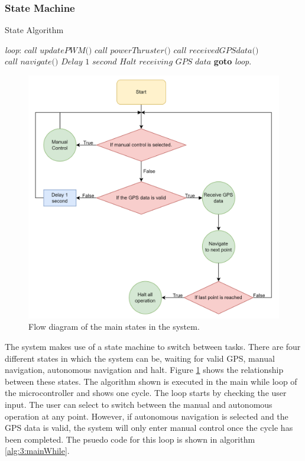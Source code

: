 		\subsubsection{State Machine}
		\begin{algorithm}[!hb]
			\caption{State Algorithm}
			\label{alg:3:mainWhile}
			\begin{algorithmic}[1]
				\BState \emph{loop}:
				\State $\textit{call updatePWM()}$
				\State $\textit{call powerThruster()}$
				\Else 
				\State $\textit{call receivedGPSdata()}$
				\State $\textit{call navigate()}$
				\Else
				\State $\textit{Delay 1 second}$
				\EndIf
				\State $\textit{Halt receiving GPS data}$
				\EndIf
				\EndIf
				\State \textbf{goto} \emph{loop}.
			\end{algorithmic}
		\end{algorithm}
	\begin{figure}[!ht]
		\begin{center}
			\includegraphics[width = 0.66\linewidth]{figures/statemachine.png}
			\caption{Flow diagram of the main states in the system.}
			\label{fig:3:stateMachine}
		\end{center}
	\end{figure}
		The system makes use of a state machine to switch between tasks. There are four different states in which the system can be, waiting for valid GPS, manual navigation, autonomous navigation and halt. Figure \ref{fig:3:stateMachine} shows the relationship between these states. The algorithm shown is executed in the main while loop of the microcontroller and shows one cycle. The loop starts by checking the user input. The user can select to switch between the manual and autonomous operation at any point. However, if autonomous navigation is selected and the GPS data is valid, the system will only enter manual control once the cycle has been completed. The psuedo code for this loop is shown in algorithm \ref{alg:3:mainWhile}.
		
